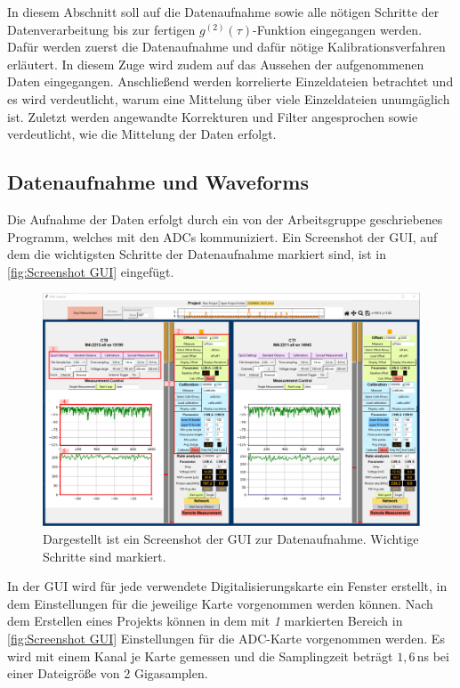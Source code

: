 In diesem Abschnitt soll auf die Datenaufnahme sowie alle nötigen Schritte der Datenverarbeitung bis zur fertigen $g^{(2)}(\tau)$-Funktion eingegangen werden. 
Dafür werden zuerst die Datenaufnahme und dafür nötige Kalibrationsverfahren erläutert. 
In diesem Zuge wird zudem auf das Aussehen der aufgenommenen Daten eingegangen. 
Anschließend werden korrelierte Einzeldateien betrachtet und es wird verdeutlicht, warum eine Mittelung über viele Einzeldateien unumgäglich ist. 
Zuletzt werden angewandte Korrekturen und Filter angesprochen sowie verdeutlicht, wie die Mittelung der Daten erfolgt. 

\subsection{Datenaufnahme und Waveforms}
\label{ssec:Datenaufnahme und Waveforms}
Die Aufnahme der Daten erfolgt durch ein von der Arbeitsgruppe geschriebenes Programm, welches mit den ADCs kommuniziert. Ein Screenshot der GUI, auf dem die wichtigsten Schritte der Datenaufnahme markiert sind, ist in \autoref{fig:Screenshot GUI} eingefügt. 
\begin{figure}[h]
    \centering
    \includegraphics[width=\textwidth]{images/Datenaufnahme/GUI.pdf}
    \caption{Dargestellt ist ein Screenshot der GUI zur Datenaufnahme. Wichtige Schritte sind markiert.}
    \label{fig:Screenshot GUI}
\end{figure}
In der GUI wird für jede verwendete Digitalisierungskarte ein Fenster erstellt, in dem Einstellungen für die jeweilige Karte vorgenommen werden können. 
Nach dem Erstellen eines Projekts können in dem mit \emph{1} markierten Bereich in \autoref{fig:Screenshot GUI} Einstellungen für die ADC-Karte vorgenommen werden. 
Es wird mit einem Kanal je Karte gemessen und die Samplingzeit beträgt $1{,}6$\,ns bei einer Dateigröße von 2 Gigasamplen. 
